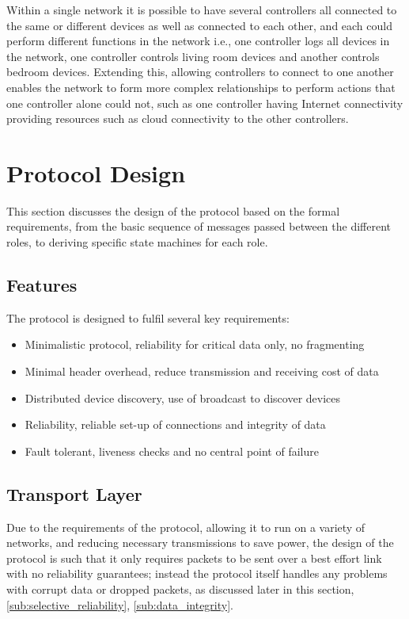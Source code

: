 Within a single network it is possible to have several controllers all connected to the same or different devices as well as connected to each other, and each could perform different functions in the network i.e., one controller logs all devices in the network, one controller controls living room devices and another controls bedroom devices. Extending this, allowing controllers to connect to one another enables the network to form more complex relationships to perform actions that one controller alone could not, such as one controller having Internet connectivity providing resources such as cloud connectivity to the other controllers.


\section{Protocol Design} %
\label{sec:protocol_design}
This section discusses the design of the protocol based on the formal requirements, from the basic sequence of messages passed between the different roles, to deriving specific state machines for each role.

\subsection{Features} %
\label{sub:features}
The protocol is designed to fulfil several key requirements:\vspace{-5mm} 
\begin{itemize}
	\item Minimalistic protocol, reliability for critical data only, no fragmenting
	\item Minimal header overhead, reduce transmission and receiving cost of data
	\item Distributed device discovery, use of broadcast to discover devices
	\item Reliability, reliable set-up of connections and integrity of data
	\item Fault tolerant, liveness checks and no central point of failure
\end{itemize}


\subsection{Transport Layer}
Due to the requirements of the protocol, allowing it to run on a variety of networks, and reducing necessary transmissions to save power, the design of the protocol is such that it only requires packets to be sent over a best effort link with no reliability guarantees; instead the protocol itself handles any problems with corrupt data or dropped packets, as discussed later in this section,\ref{sub:selective_reliability}, \ref{sub:data_integrity}. 

